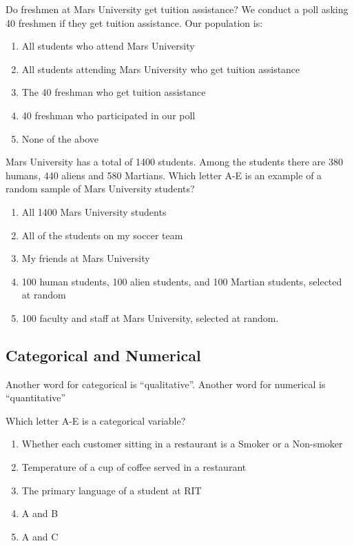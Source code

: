 \documentclass[11.5pt]{sig-alternate} %
\begin{document}
\begin{large}
Do freshmen at Mars University get tuition assistance? We conduct a poll asking 40 freshmen if they get tuition assistance. Our population is:
\begin{enumerate}[label=\Alph*.]
    \item All students who attend Mars University
    \item All students attending Mars University who get tuition assistance
    \item The 40 freshman who get tuition assistance
    \item 40 freshman who participated in our poll
    \item None of the above
\end{enumerate}

Mars University has a total of 1400 students. Among the students there are 380 humans, 440 aliens and 580 Martians. Which letter A-E is an example of a random sample of Mars University students?
\begin{enumerate}[label=\Alph*.]
    \item All 1400 Mars University students
    \item All of the students on my soccer team
    \item My friends at Mars University
    \item 100 human students, 100 alien students, and 100 Martian students, selected at random
    \item 100 faculty and staff at Mars University, selected at random.
\end{enumerate}

\subsection*{Categorical and Numerical}

Another word for categorical is “qualitative”. Another word for numerical is “quantitative”

Which letter A-E is a categorical variable?
\begin{enumerate}[label=\Alph*.]
    \item Whether each customer sitting in a restaurant is a Smoker or a Non-smoker
    \item Temperature of a cup of coffee served in a restaurant
    \item The primary language of a student at RIT
    \item A and B
    \item A and C
\end{enumerate}


\end{large}
\end{document}

